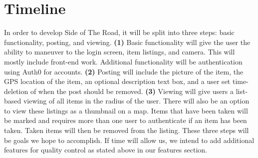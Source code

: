 \documentclass[sigconf]{acmart}
\begin{document}
\section{Timeline}
In order to develop Side of The Road, it will be split into three steps: basic functionality, posting, and viewing.
\textbf{(1)} Basic functionality will give the user the ability to maneuver to the login screen, item listings, and camera. This will mostly include front-end work. Additional functionality will be authentication using Auth0 for accounts.
\textbf{(2)} Posting will include the picture of the item, the GPS location of the item, an optional description text box, and a user set time-deletion of when the post should be removed. 
\textbf{(3)} Viewing will give users a list-based viewing of all items in the radius of the user. There will also be an option to view these listings as a thumbnail on a map. Items that have been taken will be marked and requires more than one user to authenticate if an item has been taken. Taken items will then be removed from the listing. 
These three steps will be goals we hope to accomplish. If time will allow us, we intend to add additional features for quality control as stated above in our features section.
\end{document}
